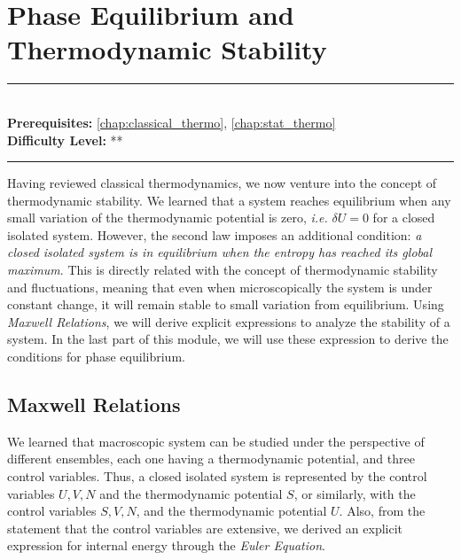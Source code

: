 \documentclass[book.tex]{subfiles}
\begin{document}
\chapter{Phase Equilibrium and Thermodynamic Stability}
\label{chap:phase_equilibrium}
\noindent\rule{11cm}{0.4pt} \\
\textbf{Prerequisites:} \autoref{chap:classical_thermo}, \autoref{chap:stat_thermo}  \\
\textbf{Difficulty Level:} ** \\
\noindent\rule{11cm}{0.4pt}
\vspace{5mm}

Having reviewed classical thermodynamics, we now venture into the concept of thermodynamic stability. We learned that a system reaches equilibrium when any small variation of the thermodynamic potential is zero, \textit{i.e.} $\delta U = 0$ for a closed isolated system. However, the second law imposes an additional condition: \textit{a closed isolated system is in equilibrium when the entropy has reached its global maximum}. This is directly related with the concept of thermodynamic stability and fluctuations, meaning that even when microscopically the system is under constant change, it will remain stable to small variation from equilibrium. Using \textit{Maxwell Relations}, we will derive explicit expressions to analyze the stability of a system. In the last part of this module, we will use these expression to derive the conditions for phase equilibrium.

\section{Maxwell Relations}

We learned that macroscopic system can be studied under the perspective of different ensembles, each one having a thermodynamic potential, and three control variables. Thus, a closed isolated system is represented by the control variables $U,V,N$ and the thermodynamic potential $S$, or similarly, with the control variables $S,V,N$, and the thermodynamic potential $U$. Also, from the statement that the control variables are extensive, we derived an explicit expression for internal energy through the \textit{Euler Equation}. 
\end{document}
